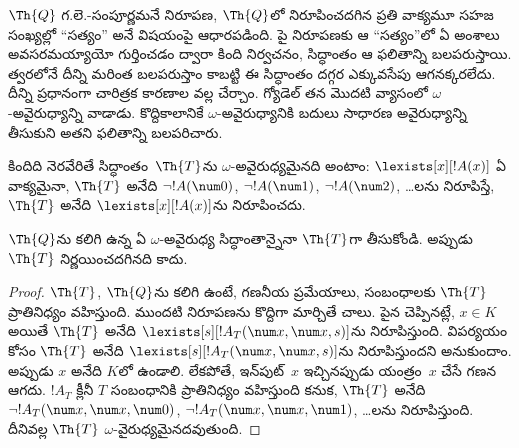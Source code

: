 \documentclass[../../../include/open-logic-section]{subfiles}
\begin{document}


\begin{explain}
$\Th{Q}$ గ.లె.-సంపూర్ణమనే నిరూపణ, $\Th{Q}$లో నిరూపించదగిన ప్రతి వాక్యమూ
సహజ సంఖ్యల్లో ``సత్యం'' అనే విషయంపై ఆధారపడింది. పై నిరూపణకు ఆ
``సత్యం''లో ఏ అంశాలు అవసరమయ్యాయో గుర్తించడం ద్వారా కింది నిర్వచనం, సిద్ధాంతం ఆ
ఫలితాన్ని బలపరుస్తాయి. త్వరలోనే దీన్ని మరింత బలపరుస్తాం కాబట్టి ఈ
సిద్ధాంతం దగ్గర ఎక్కువసేపు ఆగనక్కరలేదు. దీన్ని ప్రధానంగా చారిత్రక
కారణాల వల్ల చేర్చాం. గ్యోడెల్ తన మొదటి వ్యాసంలో $\omega$-అవైరుధ్యాన్ని
వాడాడు. కొద్దికాలానికే $\omega$-అవైరుధ్యానికి బదులు సాధారణ
అవైరుధ్యాన్ని తీసుకుని అతని ఫలితాన్ని బలపరిచారు.
\end{explain}

\begin{defn}
కిందిది నెరవేరితే సిద్ధాంతం~$\Th{T}$ను $\omega$-అవైరుధ్యమైనది అంటాం:
$\lexists[x][!A(x)]$ ఏ వాక్యమైనా, $\Th{T}$ అనేది $\lnot
!A(\num 0)$, $\lnot !A(\num 1)$, $\lnot !A(\num 2)$, \dots లను
నిరూపిస్తే, $\Th{T}$ అనేది $\lexists[x][!A(x)]$ను నిరూపించదు.
\end{defn}

\begin{thm}
$\Th{Q}$ను కలిగి ఉన్న ఏ $\omega$-అవైరుధ్య సిద్ధాంతాన్నైనా $\Th{T}$గా
  తీసుకోండి. అప్పుడు $\Th{T}$ నిర్ణయించదగినది కాదు.
\end{thm}

\begin{proof}
$\Th{T}$, $\Th{Q}$ను కలిగి ఉంటే, గణనీయ ప్రమేయాలు, సంబంధాలకు $\Th{T}$
ప్రాతినిధ్యం వహిస్తుంది. ముందటి నిరూపణను కొద్దిగా మార్చితే చాలు. పైన చెప్పినట్లే,
$x \in K$ అయితే $\Th{T}$ అనేది $\lexists[s][!A_T(\num
  x,\num x, s)]$ను నిరూపిస్తుంది. విపర్యయం కోసం $\Th{T}$ అనేది
$\lexists[s][!A_T(\num x, \num x, s)]$ను నిరూపిస్తుందని అనుకుందాం. అప్పుడు
$x$ అనేది $K$లో ఉండాలి. లేకపోతే, ఇన్‌పుట్~$x$ ఇచ్చినప్పుడు యంత్రం~$x$
చేసే గణన ఆగదు.
$!A_T$ క్లీనీ $T$ సంబంధానికి ప్రాతినిధ్యం వహిస్తుంది కనుక, $\Th{T}$ అనేది
$\lnot !A_T(\num x, \num x, \num 0)$, $\lnot !A_T(\num x, \num
x, \num 1)$, \dots లను నిరూపిస్తుంది. దీనివల్ల $\Th{T}$
$\omega$-వైరుధ్యమైనదవుతుంది.
\end{proof}
\end{document}
